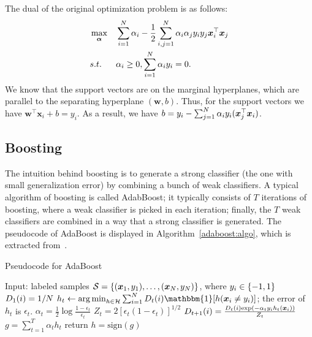         The dual of the original optimization problem is as follows:
            \begin{equation}
                \begin{aligned}
                    & \max_{\bm{\alpha}} & & \sum_{i=1}^{N}{\alpha_i} - \frac{1}{2}\sum_{i,j=1}^{N}{\alpha_i \alpha_j y_i y_j \bm{x}_i^\top \bm{x}_j} \\
                    & s.t. & & \alpha_i \ge 0, \sum_{i=1}^{N}{\alpha_i y_i} = 0.
                \end{aligned}
            \end{equation}
        We know that the support vectors are on the marginal hyperplanes, which are parallel to the separating hyperplane $(\bm{w}, b)$.
        Thus, for the support vectors we have $\bm{w}^\top \bm{x}_i + b = y_i$.
        As a result, we have $b = y_i - \sum_{j=1}^{N}{\alpha_i y_i (\bm{x}_j^\top \bm{x}_i) }$.
    
    
\subsection{Boosting}
The intuition behind boosting is to generate a strong classifier (the one with small generalization error) by combining a bunch of weak classifiers. 
A typical algorithm of boosting is called AdabBoost; it typically consists of $T$ iterations of boosting, where a weak classifier is picked in each iteration; finally, the $T$ weak classifiers are combined in a way that a strong classifier is generated. 
The pseudocode of AdaBoost is displayed in Algorithm~\ref{adaboost:algo}, which is extracted from~\cite{mohri2018foundations}.

\begin{algorithm}[ht]
\caption{Pseudocode for AdaBoost}\label{adaboost:algo}
\begin{algorithmic}[1]
\State Input: \ndata labeled samples $\mathcal{S}=\{ (\bm{x}_1, y_1), \ldots, (\bm{x}_N, y_N) \}$, where $y_i \in \{ -1, 1 \}$
    \State $D_1(i) = 1 / N$ 
\EndFor
{} 
    \State $h_t \leftarrow \argmin_{h \in \mathcal{H}} \sum_{i=1}^{\ndata}{D_t(i) \mathbbm{1}[h(\bm{x}_i \ne y_i)]}$; the error of $h_t$ is $\epsilon_t$. \label{adaboost:pick-classifier}
    \State $\alpha_t = \frac{1}{2}\log \frac{1-\epsilon_t}{\epsilon_t}$ \label{adaboost:weight-classifier}
    \State $Z_t = 2 \left[ \epsilon_t(1 - \epsilon_t) \right]^{1/2}$ 
     \label{adaboost:weight-sample}
        \State $D_{t+1}(i) = \frac{D_t(i) \text{exp}\left( -\alpha_t y_i h_t(\bm{x}_i) \right) }{Z_t}$ 
    \EndFor
\EndFor
\State $g = \sum_{t=1}^{T}{\alpha_t h_t}$ 
\State return $h=\text{sign}(g)$
\end{algorithmic}
\end{algorithm}

